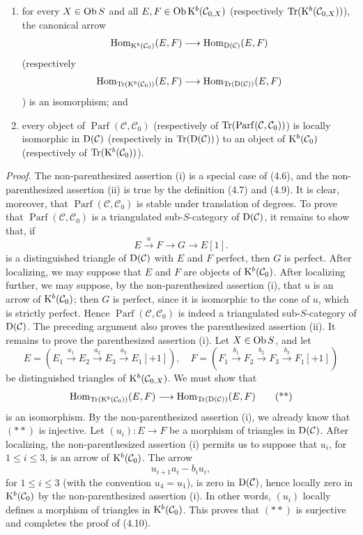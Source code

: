 \documentclass[11pt]{article}
\newcommand{\Parf}{\operatorname{Parf}}
\begin{document}
\begin{enumerate}[label=(\roman*)]
\item for every \(X\in\operatorname{Ob} S\) and all \(E,F\in\operatorname{Ob}\mathrm K^b(\mathcal C_{0,X})\) (respectively \(\operatorname{Tr}(\mathrm K^b(\mathcal C_{0,X}))\)), the canonical arrow
\[
  \operatorname{Hom}_{\mathrm K^b(\mathcal C_0)}(E,F)
  \longrightarrow
  \operatorname{Hom}_{\mathrm D(\mathcal C)}(E,F)
\]
(respectively
\[
  \operatorname{Hom}_{\operatorname{Tr}(\mathrm K^b(\mathcal C_0))}(E,F)
  \longrightarrow
  \operatorname{Hom}_{\operatorname{Tr}(\mathrm D(\mathcal C))}(E,F)
\]) is an isomorphism; and
\item every object of \(\Parf(\mathcal C,\mathcal C_0)\) (respectively of \(\Tr(\Parf(\mathcal C,\mathcal C_0))\)) is locally isomorphic in \(\mathrm D(\mathcal C)\) (respectively in \(\operatorname{Tr}(\mathrm D(\mathcal C))\)) to an object of \(\mathrm K^b(\mathcal C_0)\) (respectively of \(\operatorname{Tr}(\mathrm K^b(\mathcal C_0))\)).
\end{enumerate}

\emph{Proof.} The non-parenthesized assertion (i) is a special case of (4.6), and the non-parenthesized assertion (ii) is true by the definition (4.7) and (4.9). It is clear, moreover, that \(\Parf(\mathcal C,\mathcal C_0)\) is stable under translation of degrees. To prove that \(\Parf(\mathcal C,\mathcal C_0)\) is a triangulated sub-\(S\)-category of \(\mathrm D(\mathcal C)\), it remains to show that, if
\[
  E\xrightarrow{u}F\longrightarrow G\longrightarrow E[1].
  \tag{*}
\]
is a distinguished triangle of \(\mathrm D(\mathcal C)\) with \(E\) and \(F\) perfect, then \(G\) is perfect. After localizing, we may suppose that \(E\) and \(F\) are objects of \(\mathrm K^b(\mathcal C_0)\). After localizing further, we may suppose, by the non-parenthesized assertion (i), that \(u\) is an arrow of \(\mathrm K^b(\mathcal C_0)\); then \(G\) is perfect, since it is isomorphic to the cone of \(u\), which is strictly perfect. Hence \(\Parf(\mathcal C,\mathcal C_0)\) is indeed a triangulated sub-\(S\)-category of \(\mathrm D(\mathcal C)\). The preceding argument also proves the parenthesized assertion (ii). It remains to prove the parenthesized assertion (i). Let \(X\in\operatorname{Ob} S\), and let
\[
E=(E_1\xrightarrow{a_1}E_2\xrightarrow{a_2}E_3\xrightarrow{a_3}E_1[+1]),
\quad
F=(F_1\xrightarrow{b_1}F_2\xrightarrow{b_2}F_3\xrightarrow{b_3}F_1[+1])
\]
be distinguished triangles of \(\mathrm K^b(\mathcal C_{0,X})\). We must show that
\[
  \operatorname{Hom}_{\operatorname{Tr}(\mathrm K^b(\mathcal C_0))}(E,F)
  \longrightarrow
  \operatorname{Hom}_{\operatorname{Tr}(\mathrm D(\mathcal C))}(E,F)
  \tag{**}
\]
is an isomorphism. By the non-parenthesized assertion (i), we already know that \((**)\) is injective. Let \((u_i):E\to F\) be a morphism of triangles in \(\mathrm D(\mathcal C)\). After localizing, the non-parenthesized assertion (i) permits us to suppose that \(u_i\), for \(1\leq i\leq3\), is an arrow of \(\mathrm K^b(\mathcal C_0)\). The arrow
\[
  u_{i+1}a_i-b_iu_i,
\]
for \(1\leq i\leq3\) (with the convention \(u_4=u_1\)), is zero in \(\mathrm D(\mathcal C)\), hence locally zero in \(\mathrm K^b(\mathcal C_0)\) by the non-parenthesized assertion (i). In other words, \((u_i)\) locally defines a morphism of triangles in \(\mathrm K^b(\mathcal C_0)\). This proves that \((**)\) is surjective and completes the proof of (4.10).
\end{document}

